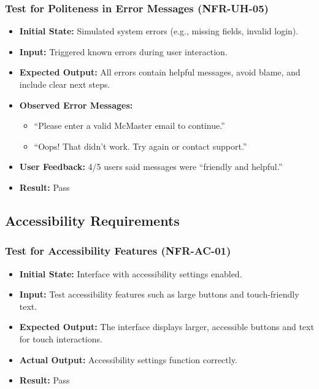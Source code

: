 \documentclass[12pt, titlepage]{article}
\begin{document}
\subsubsection{Test for Politeness in Error Messages (NFR-UH-05)}
\begin{itemize}
    \item \textbf{Initial State:} Simulated system errors (e.g., missing fields, invalid login).
    \item \textbf{Input:} Triggered known errors during user interaction.
    \item \textbf{Expected Output:} All errors contain helpful messages, avoid blame, and include clear next steps.
    \item \textbf{Observed Error Messages:}
    \begin{itemize}
        \item “Please enter a valid McMaster email to continue.”
        \item “Oops! That didn’t work. Try again or contact support.”
    \end{itemize}
    \item \textbf{User Feedback:} 4/5 users said messages were “friendly and helpful.”
    \item \textbf{Result:} Pass
\end{itemize}


\subsection{Accessibility Requirements}

\subsubsection{Test for Accessibility Features (NFR-AC-01)}
\begin{itemize}
    \item \textbf{Initial State: }Interface with accessibility settings enabled.
    \item \textbf{Input: }Test accessibility features such as large buttons and touch-friendly text.
    \item \textbf{Expected Output: }The interface displays larger, accessible buttons and text for touch interactions.
    \item \textbf{Actual Output: }Accessibility settings function correctly.
    \item \textbf{Result: }Pass
\end{itemize}
\end{document}
